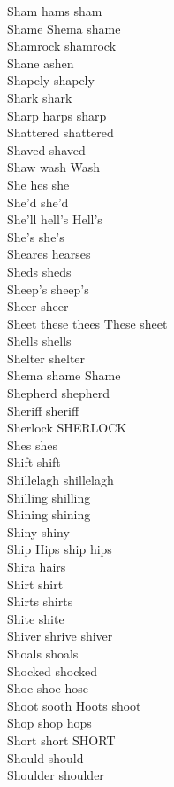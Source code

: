 Sham hams sham\\
Shame Shema shame\\
Shamrock shamrock\\
Shane ashen\\
Shapely shapely\\
Shark shark\\
Sharp harps sharp\\
Shattered shattered\\
Shaved shaved\\
Shaw wash Wash\\
She hes she\\
She'd she'd\\
She'll hell's Hell's\\
She's she's\\
Sheares hearses\\
Sheds sheds\\
Sheep's sheep's\\
Sheer sheer\\
Sheet these thees These sheet\\
Shells shells\\
Shelter shelter\\
Shema shame Shame\\
Shepherd shepherd\\
Sheriff sheriff\\
Sherlock SHERLOCK\\
Shes shes\\
Shift shift\\
Shillelagh shillelagh\\
Shilling shilling\\
Shining shining\\
Shiny shiny\\
Ship Hips ship hips\\
Shira hairs\\
Shirt shirt\\
Shirts shirts\\
Shite shite\\
Shiver shrive shiver\\
Shoals shoals\\
Shocked shocked\\
Shoe shoe hose\\
Shoot sooth Hoots shoot\\
Shop shop hops\\
Short short SHORT\\
Should should\\
Shoulder shoulder\\
